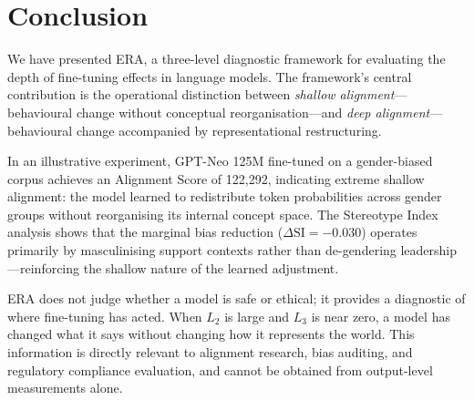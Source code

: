 \documentclass[11pt,a4paper]{article}
\newcommand{\DeltaSI}{\Delta\mathrm{SI}}
\begin{document}
\section{Conclusion}

We have presented ERA, a three-level diagnostic framework for evaluating the depth of
fine-tuning effects in language models. The framework's central contribution is the
operational distinction between \emph{shallow alignment}---behavioural change without
conceptual reorganisation---and \emph{deep alignment}---behavioural change accompanied
by representational restructuring.

In an illustrative experiment, GPT-Neo 125M fine-tuned on a gender-biased corpus
achieves an Alignment Score of 122{,}292, indicating extreme shallow alignment: the
model learned to redistribute token probabilities across gender groups without reorganising
its internal concept space. The Stereotype Index analysis shows that the marginal bias
reduction ($\DeltaSI = -0.030$) operates primarily by masculinising support contexts
rather than de-gendering leadership---reinforcing the shallow nature of the learned
adjustment.

ERA does not judge whether a model is safe or ethical; it provides a diagnostic of where
fine-tuning has acted. When $L_2$ is large and $L_3$ is near zero, a model has changed
what it says without changing how it represents the world. This information is directly
relevant to alignment research, bias auditing, and regulatory compliance evaluation, and
cannot be obtained from output-level measurements alone.
\end{document}
